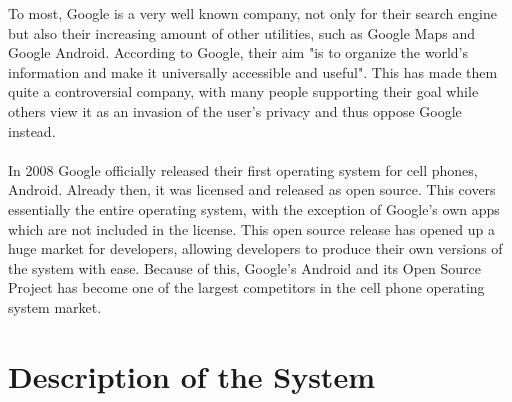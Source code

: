 \documentclass[conference]{IEEEtran}
\begin{document}

To most, Google\cite{android} is a very well known company, not only for their search engine but also their increasing amount of other utilities, such as Google Maps and Google Android. According to Google, their aim "is to organize the world’s information and make it universally accessible and useful".\cite{Goggin} This has made them quite a controversial company, with many people supporting their goal while others view it as an invasion of the user's privacy and thus oppose Google instead. 
\\\\In 2008 Google officially released their first operating system for cell phones, Android.\cite{android-release} Already then, it was licensed and released as open source.\cite{android} This covers essentially the entire operating system, with the exception of Google's own apps which are not included in the license. This open source release has opened up a huge market for developers, allowing developers to produce their own versions of the system with ease. Because of this, Google's Android and its Open Source Project has become one of the largest competitors in the cell phone operating system market.\cite{android-market}

\section{Description of the System}
\label{system}
\end{document}
